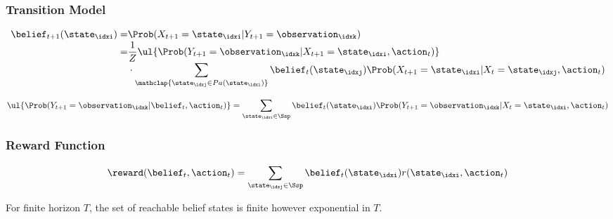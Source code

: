 \subsubsection{Transition Model}\label{subsubsec:transition_model}
\begin{defnbox}\nospacing
  \begin{defn}\label{defn:pomdp_state_update}
    \begin{align}
      \belief_{t+1}(\state_{\idxi})=&\Prob(X_{t+1}=\state_{\idxi}|Y_{t+1}=\observation_{\idxk})\nonumber\\[-1\jot]
      =&\frac{1}{Z}\ul{\Prob(Y_{t+1}=\observation_{\idxk}|X_{t+1}=\state_{\idxi},\action_{t})}\nonumber\\[-1\jot]
      &\cdot\sum_{\mathclap{\state_{\idxj}\in Pa(\state_{\idxi})}}\belief_{t}(\state_{\idxj})\Prob(X_{t+1}=\state_{\idxi}|X_{t}=\state_{\idxj},\action_{t})
    \end{align}
  \end{defn}
\end{defnbox}
\begin{defnbox}\nospacing
  \begin{defn}\label{defn:observation_model}
    \begin{align}
      \ul{\Prob(Y_{t+1}=\observation_{\idxk}|\belief_{t},\action_{t})}=
      \sum_{\state_{\idxi}\in\Ssp}\belief_{t}(\state_{\idxi})\Prob(Y_{t+1}=\observation_{\idxk}|X_{t}=\state_{\idxi},\action_{t})
    \end{align}
  \end{defn}
\end{defnbox}
\subsubsection{Reward Function}\label{subsubsec:reward_function}
\begin{defnbox}\nospacing
  \begin{defn}\label{defn:pomdp_reward_function}
    \begin{align}
        \reward(\belief_{t},\action_{t})=\sum_{\state_{\idxj}\in\Ssp}\belief_{t}(\state_{\idxi})r(\state_{\idxi},\action_{t})
    \end{align}
  \end{defn}
\end{defnbox}
\begin{notebox}[Note]\nospacing
  For finite horizon $T$, the set of reachable belief states is finite however
  exponential in $T$.
\end{notebox}
